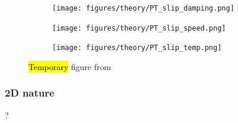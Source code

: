 \begin{figure}[H]
  \centering
  \begin{subfigure}[t]{0.32\textwidth}
      \centering
      \texttt{[image: figures/theory/PT\_slip\_damping.png]}
      \caption{}
  \end{subfigure}
  \hfill
  \begin{subfigure}[t]{0.32\textwidth}
      \centering
      \texttt{[image: figures/theory/PT\_slip\_speed.png]}
      \caption{}
  \end{subfigure}
  \hfill
  \begin{subfigure}[t]{0.32\textwidth}
      \centering
      \texttt{[image: figures/theory/PT\_slip\_temp.png]}
      \caption{}
  \end{subfigure}
  \hfill
     \caption{\hl{Temporary} figure from \cite{Yalin_2011}}
     \label{fig:PT_slip_var}
\end{figure}







\subsubsection{2D nature}
?








